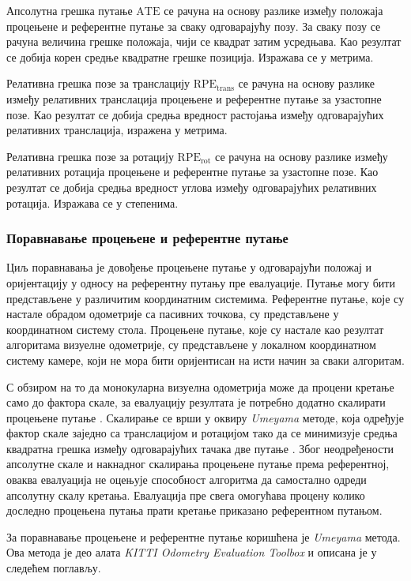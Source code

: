 \documentclass[12pt]{article}
\begin{document}
Апсолутна грешка путање $\mathrm{ATE}$ се рачуна на основу разлике између
положаја процењене и референтне путање за сваку одговарајућу позу. За сваку
позу се рачуна величина грешке положаја, чији се квадрат затим усредњава. Као
резултат се добија корен средње квадратне грешке позиција. Изражава се у
метрима.

Релативна грешка позе за транслацију $\mathrm{RPE}_{\mathrm{trans}}$ се рачуна
на основу разлике између релативних транслација процењене и референтне путање
за узастопне позе. Као резултат се добија средња вредност растојања између
одговарајућих релативних транслација, изражена у метрима.

Релативна грешка позе за ротацију $\mathrm{RPE}_{\mathrm{rot}}$ се рачуна на
основу разлике између релативних ротација процењене и референтне путање за
узастопне позе. Као резултат се добија средња вредност углова између
одговарајућих релативних ротација. Изражава се у степенима.

\subsubsection{Поравнавање процењене и референтне путање}
Циљ поравнавања је довођење процењене путање у одговарајући положај и
оријентацију у односу на референтну путању пре евалуације. Путање могу бити
представљене у различитим координатним системима. Референтне путање, које су
настале обрадом одометрије са пасивних точкова, су представљене у координатном
систему стола. Процењене путање, које су настале као резултат алгоритама
визуелне одометрије, су представљене у локалном координатном систему камере,
који не мора бити оријентисан на исти начин за сваки алгоритам.

С обзиром на то да монокуларна визуелна одометрија може да процени кретање само
до фактора скале, за евалуацију резултата је потребно додатно скалирати
процењене путање \cite{scaramuzza2011visual}. Скалирање се врши у оквиру
\textit{Umeyama} методе, која одређује фактор скале заједно са транслацијом и
ротацијом тако да се минимизује средња квадратна грешка између одговарајућих
тачака две путање \cite{umeyama1991least}. Због неодређености апсолутне скале и
накнадног скалирања процењене путање према референтној, оваква евалуација не
оцењује способност алгоритма да самостално одреди апсолутну скалу кретања.
Евалуација пре свега омогућава процену колико доследно процењена путања прати
кретање приказано референтном путањом.

За поравнавање процењене и референтне путање коришћена је \textit{Umeyama}
метода. Ова метода је део алата \textit{KITTI Odometry Evaluation Toolbox} и
описана је у следећем поглављу.
\end{document}
